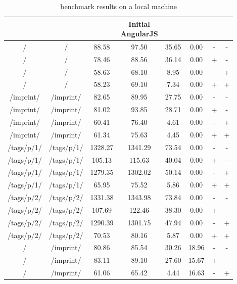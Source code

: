 \begin{appendix}
\subsubsection{\selenium{}}
\begin{center}
\footnotesize
\begin{longtable}{cccccccc}
    \caption{\selenium{} benchmark results on a local machine}
    \\
	\hline
	\thead{From} & \thead{To} & \thead{Common} & \thead{Initial\\AngularJS} & \thead{\lare{}} & \thead{AngularJS} &  \thead{DC} & \thead{TC} \\
\hline
/ & / & 88.58 & 97.50 & 35.65 & 0.00 & - & - \\
/ & / & 78.46 & 88.56 & 36.14 & 0.00 & + & - \\
/ & / & 58.63 & 68.10 & 8.95 & 0.00 & - & + \\
/ & / & 58.23 & 69.10 & 7.34 & 0.00 & + & + \\
\hline
/imprint/ & /imprint/ & 82.65 & 89.95 & 27.75 & 0.00 & - & - \\
/imprint/ & /imprint/ & 81.02 & 93.85 & 28.71 & 0.00 & + & - \\
/imprint/ & /imprint/ & 60.41 & 76.40 & 4.61 & 0.00 & - & + \\
/imprint/ & /imprint/ & 61.34 & 75.63 & 4.45 & 0.00 & + & + \\
\hline
/tags/p/1/ & /tags/p/1/ & 1328.27 & 1341.29 & 73.54 & 0.00 & - & - \\
/tags/p/1/ & /tags/p/1/ & 105.13 & 115.63 & 40.04 & 0.00 & + & - \\
/tags/p/1/ & /tags/p/1/ & 1279.35 & 1302.02 & 50.14 & 0.00 & - & + \\
/tags/p/1/ & /tags/p/1/ & 65.95 & 75.52 & 5.86 & 0.00 & + & + \\
\hline
/tags/p/2/ & /tags/p/2/ & 1331.38 & 1343.98 & 73.84 & 0.00 & - & - \\
/tags/p/2/ & /tags/p/2/ & 107.69 & 122.46 & 38.30 & 0.00 & + & - \\
/tags/p/2/ & /tags/p/2/ & 1290.39 & 1301.75 & 47.94 & 0.00 & - & + \\
/tags/p/2/ & /tags/p/2/ & 70.53 & 80.16 & 5.87 & 0.00 & + & + \\
\hline
\hline
/ & /imprint/ & 80.86 & 85.54 & 30.26 & 18.96 & - & - \\
/ & /imprint/ & 83.11 & 89.10 & 27.60 & 15.67 & + & - \\
/ & /imprint/ & 61.06 & 65.42 & 4.44 & 16.63 & - & + \\

\end{longtable}
\end{center}
\end{appendix}
